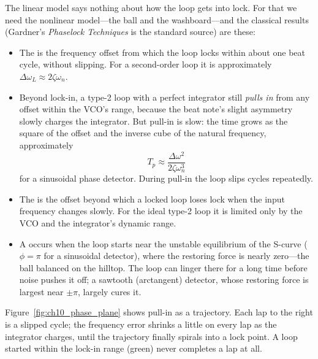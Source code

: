 The linear model says nothing about how the loop gets into lock. For that we need the nonlinear
model---the ball and the washboard---and the classical results (Gardner's \emph{Phaselock
Techniques} is the standard source) are these:
\begin{itemize}
\item The  is the frequency offset from which the loop locks within about one
beat cycle, without slipping. For a second-order loop it is approximately $\Delta\omega_L\approx2\zeta\omega_n$.
\item Beyond lock-in, a type-2 loop with a perfect integrator still \emph{pulls in} from any offset
within the VCO's range, because the beat note's slight asymmetry slowly charges the integrator. But
pull-in is slow: the time grows as the square of the offset and the inverse cube of the natural
frequency, approximately
\begin{equation}
T_p\approx\frac{\Delta\omega^2}{2\zeta\omega_n^3}
\label{eq:ch10:pullin}
\end{equation}
for a sinusoidal phase detector. During pull-in the loop slips cycles repeatedly.
\item The  is the offset beyond which a locked loop loses lock when the input
frequency changes slowly. For the ideal type-2 loop it is limited only by the VCO and the
integrator's dynamic range.
\item A  occurs when the loop starts near the unstable equilibrium of the S-curve
($\phi=\pi$ for a sinusoidal detector), where the restoring force is nearly zero---the ball
balanced on the hilltop. The loop can linger there for a long time before noise pushes it off;
a sawtooth (arctangent) detector, whose restoring force is largest near $\pm\pi$, largely cures it.
\end{itemize}
Figure~\ref{fig:ch10_phase_plane} shows pull-in as a trajectory. Each lap to the right is a slipped
cycle; the frequency error shrinks a little on every lap as the integrator charges, until the
trajectory finally spirals into a lock point. A loop started within the lock-in range (green)
never completes a lap at all.


